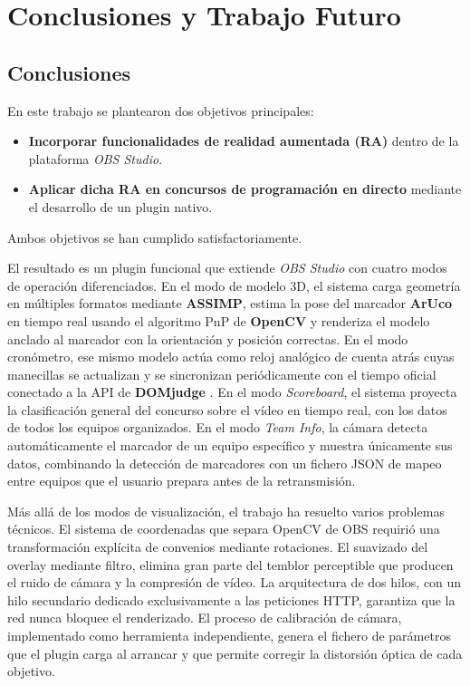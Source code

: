 \chapter{Conclusiones y Trabajo Futuro}
\label{cap:conclusiones}


\section{Conclusiones}

En este trabajo se plantearon dos objetivos principales:

\begin{itemize}
    \item \textbf{Incorporar funcionalidades de realidad aumentada (RA)} dentro de la plataforma \textit{OBS Studio}.
    \item \textbf{Aplicar dicha RA en concursos de programación en directo} mediante el desarrollo de un plugin nativo.
\end{itemize}

Ambos objetivos se han cumplido satisfactoriamente.

El resultado es un plugin funcional que extiende \textit{OBS Studio} con cuatro modos de operación diferenciados. En el modo de modelo 3D, el sistema carga geometría en múltiples formatos mediante \textbf{ASSIMP}, estima la pose del marcador \textbf{ArUco} en tiempo real usando el algoritmo PnP de \textbf{OpenCV} y renderiza el modelo anclado al marcador con la orientación y posición correctas. En el modo cronómetro, ese mismo modelo actúa como reloj analógico de cuenta atrás cuyas manecillas se actualizan y se sincronizan periódicamente con el tiempo oficial conectado a la API de \textbf{DOMjudge} \citep{DOMjudge}. En el modo \textit{Scoreboard}, el sistema proyecta la clasificación general del concurso sobre el vídeo en tiempo real, con los datos de todos los equipos organizados. En el modo \textit{Team Info}, la cámara detecta automáticamente el marcador de un equipo específico y muestra únicamente sus datos, combinando la detección de marcadores con un fichero JSON de mapeo entre equipos que el usuario prepara antes de la retransmisión.

Más allá de los modos de visualización, el trabajo ha resuelto varios problemas técnicos. El sistema de coordenadas que separa OpenCV de OBS requirió una transformación explícita de convenios mediante rotaciones. El suavizado del overlay mediante filtro, elimina gran parte del temblor perceptible que producen el ruido de cámara y la compresión de vídeo. La arquitectura de dos hilos, con un hilo secundario dedicado exclusivamente a las peticiones HTTP, garantiza que la red nunca bloquee el renderizado. El proceso de calibración de cámara, implementado como herramienta independiente, genera el fichero de parámetros que el plugin carga al arrancar y que permite corregir la distorsión óptica de cada objetivo.

